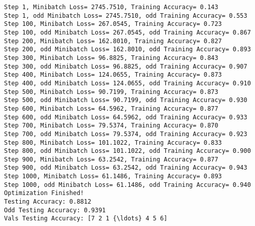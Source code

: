\documentclass[11pt]{article}
\begin{document}
    \begin{Verbatim}[commandchars=\\\{\}]
Step 1, Minibatch Loss= 2745.7510, Training Accuracy= 0.143
Step 1, odd Minibatch Loss= 2745.7510, odd Training Accuracy= 0.553
Step 100, Minibatch Loss= 267.0545, Training Accuracy= 0.723
Step 100, odd Minibatch Loss= 267.0545, odd Training Accuracy= 0.867
Step 200, Minibatch Loss= 162.8010, Training Accuracy= 0.827
Step 200, odd Minibatch Loss= 162.8010, odd Training Accuracy= 0.893
Step 300, Minibatch Loss= 96.8825, Training Accuracy= 0.843
Step 300, odd Minibatch Loss= 96.8825, odd Training Accuracy= 0.907
Step 400, Minibatch Loss= 124.0655, Training Accuracy= 0.873
Step 400, odd Minibatch Loss= 124.0655, odd Training Accuracy= 0.910
Step 500, Minibatch Loss= 90.7199, Training Accuracy= 0.873
Step 500, odd Minibatch Loss= 90.7199, odd Training Accuracy= 0.930
Step 600, Minibatch Loss= 64.5962, Training Accuracy= 0.877
Step 600, odd Minibatch Loss= 64.5962, odd Training Accuracy= 0.933
Step 700, Minibatch Loss= 79.5374, Training Accuracy= 0.870
Step 700, odd Minibatch Loss= 79.5374, odd Training Accuracy= 0.923
Step 800, Minibatch Loss= 101.1022, Training Accuracy= 0.833
Step 800, odd Minibatch Loss= 101.1022, odd Training Accuracy= 0.900
Step 900, Minibatch Loss= 63.2542, Training Accuracy= 0.877
Step 900, odd Minibatch Loss= 63.2542, odd Training Accuracy= 0.943
Step 1000, Minibatch Loss= 61.1486, Training Accuracy= 0.893
Step 1000, odd Minibatch Loss= 61.1486, odd Training Accuracy= 0.940
Optimization Finished!
Testing Accuracy: 0.8812
Odd Testing Accuracy: 0.9391
Vals Testing Accuracy: [7 2 1 {\ldots} 4 5 6]

    \end{Verbatim}
\end{document}
